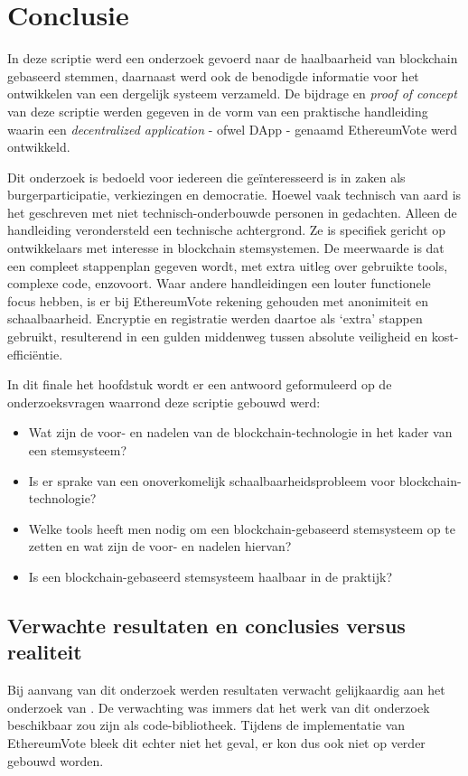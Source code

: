 
\chapter{Conclusie}
\label{ch:conclusie}
In deze scriptie werd een onderzoek gevoerd naar de haalbaarheid van blockchain gebaseerd stemmen, daarnaast werd ook de benodigde informatie voor het ontwikkelen van een dergelijk systeem  verzameld. De bijdrage en \textit{proof of concept} van deze scriptie werden gegeven in de vorm van een praktische handleiding waarin een \textit{decentralized application} - ofwel DApp -  genaamd EthereumVote werd ontwikkeld. 

 Dit onderzoek is bedoeld voor iedereen die geïnteresseerd is in zaken als burgerparticipatie, verkiezingen en democratie. Hoewel vaak technisch van aard is het geschreven met niet technisch-onderbouwde personen in gedachten. Alleen de handleiding verondersteld een technische achtergrond. Ze is specifiek gericht op ontwikkelaars met interesse in blockchain stemsystemen. De meerwaarde is dat een compleet stappenplan gegeven wordt, met extra uitleg over gebruikte tools, complexe code, enzovoort. Waar andere handleidingen een louter functionele focus hebben, is er bij EthereumVote rekening gehouden met anonimiteit en schaalbaarheid. Encryptie en registratie werden daartoe als `extra' stappen gebruikt, resulterend in een gulden middenweg tussen absolute veiligheid en kost-efficiëntie.
 
In dit finale het hoofdstuk wordt er een antwoord geformuleerd op de onderzoeksvragen waarrond deze scriptie gebouwd werd:
\begin{itemize}
	\item Wat zijn de voor- en nadelen van de blockchain-technologie in het kader van een stemsysteem?
	\item Is er sprake van een onoverkomelijk schaalbaarheidsprobleem voor blockchain-technologie?
	\item Welke tools heeft men nodig om een blockchain-gebaseerd stemsysteem op te zetten en wat zijn de voor- en nadelen hiervan?
	\item Is een blockchain-gebaseerd stemsysteem haalbaar in de praktijk?
\end{itemize}
\section{Verwachte resultaten en conclusies versus realiteit}
Bij aanvang van dit onderzoek werden resultaten verwacht gelijkaardig aan het onderzoek van \textcite{McCorry2017}. De verwachting was immers dat het werk van dit onderzoek beschikbaar zou zijn als code-bibliotheek. Tijdens de implementatie van EthereumVote bleek dit echter niet het geval, er kon dus ook niet op verder gebouwd worden. 

